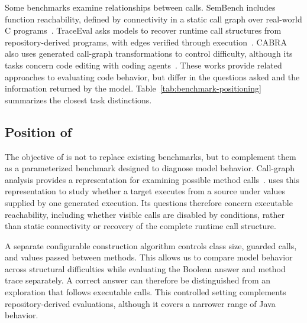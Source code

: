 Some benchmarks examine relationships between calls. SemBench includes function reachability, defined by connectivity in a static call graph over real-world C programs~\cite{xu2026semb}. TraceEval asks models to recover runtime call structures from repository-derived programs, with edges verified through execution~\cite{li2026traceeval}. CABRA also uses generated call-graph transformations to control difficulty, although its tasks concern code editing with coding agents~\cite{balepur2026cabra}. These works provide related approaches to evaluating code behavior, but differ in the questions asked and the information returned by the model. Table~\ref{tab:benchmark-positioning} summarizes the closest task distinctions.



\subsection{Position of \benchmark}

The objective of \benchmark is not to replace existing benchmarks, but to complement them as a parameterized benchmark designed to diagnose model behavior. Call-graph analysis provides a representation for examining possible method calls~\cite{grove2001framework,tip2000scalable}. \benchmark uses this representation to study whether a target executes from a source under values supplied by one generated execution. Its questions therefore concern executable reachability, including whether visible calls are disabled by conditions, rather than static connectivity or recovery of the complete runtime call structure.

A separate configurable construction algorithm controls class size, guarded calls, and values passed between methods. This allows us to compare model behavior across structural difficulties while evaluating the Boolean answer and method trace separately. A correct answer can therefore be distinguished from an exploration that follows executable calls. This controlled setting complements repository-derived evaluations, although it covers a narrower range of Java behavior.
